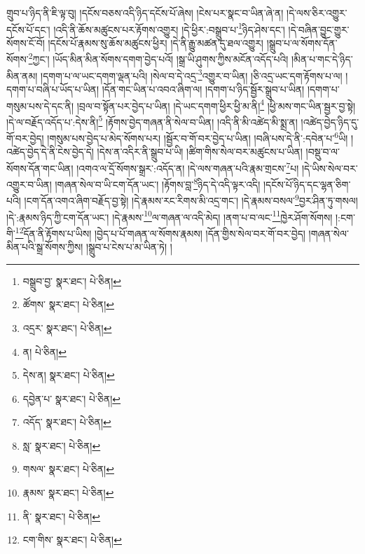 གྲུབ་པ་ཉིད་ནི་ཇི་ལྟ་བུ། །དངོས་བཅས་འདི་ཉིད་དངོས་པོ་ཞེས། །ངེས་པར་སྣང་བ་ཡིན་ཞེ་ན། །དེ་ལས་ཅིར་འགྱུར་དངོས་པོ་དང་། །འདི་ནི་ཆོས་མཚུངས་པར་རྟོགས་འགྱུར། །དེ་ཕྱིར་:བསྒྲུབ་པ་\footnote{བསྒྲུབ་བྱ་  སྣར་ཐང་།  པེ་ཅིན། }ཉིད་ཤེས་དང་། །དེ་བཞིན་བྱུང་གྱུར་སོགས་ངོ་བོ། །དངོས་པོ་རྣམས་སུ་ཆོས་མཚུངས་ཕྱིར། །དེ་ནི་རྒྱུ་མཚན་དུ་ཐལ་འགྱུར། །སྒྲུབ་པ་ལ་སོགས་དོན་སོགས་\footnote{ཚོགས་  སྣར་ཐང་།  པེ་ཅིན། }ཀྱང་། །ཡོད་མིན་མིན་སོགས་དགག་བྱེད་པའོ། །སྒྲ་ཡི་ཤུགས་ཀྱིས་མངོན་འདོད་པའི། །མིན་པ་གང་དེ་ཉིད་མིན་ནམ། །དགག་པ་ལ་ཡང་དགག་ལྡན་པའི། །སེལ་བ་དེ་འདྲ་\footnote{འདྲར་  སྣར་ཐང་།  པེ་ཅིན། }འགྱུར་བ་ཡིན། །ཅི་འདྲ་ཡང་དག་རྟོགས་པ་ལ། །དགག་པ་བཞི་པ་ཡོད་པ་ཡིན། །དོན་གང་ཡིན་པ་འབའ་ཞིག་ལ། །དགག་པ་ཉིད་སྦྱོར་སྒྲུབ་པ་ཡིན། །དགག་པ་གསུམ་པས་དེ་དང་ནི། །བྲལ་བ་སྟོན་པར་བྱེད་པ་ཡིན། །དེ་ཡང་དགག་ཕྱིར་ཕྱི་མ་ནི།\footnote{ན།  པེ་ཅིན། } །ཕྱི་མས་གང་ཡིན་སྦྱར་བྱ་སྟེ། །དེ་ལ་བརྗོད་འདོད་པ་:དེས་ནི།\footnote{དེས་ན།  སྣར་ཐང་།  པེ་ཅིན། } །རྟོགས་བྱེད་གཞན་ནི་སེལ་བ་ཡིན། །འདི་ནི་མི་འཚེད་མི་སྨྲ་ན། །འཚེད་བྱེད་ཉིད་དུ་གོ་བར་བྱེད། །གསུམ་པས་བྱེད་པ་མེད་སོགས་པར། །སྦྱོར་བ་གོ་བར་བྱེད་པ་ཡིན། །བཞི་པས་དེ་ནི་:དབེན་པ་\footnote{དབྱེན་པ་  སྣར་ཐང་།  པེ་ཅིན། }ཡི། །འཚེད་བྱེད་དེ་ནི་ངེས་བྱེད་དེ། །དེས་ན་འདིར་ནི་སྒྲུབ་པ་ཡི། །ཚིག་གིས་སེལ་བར་མཚུངས་པ་ཡིན། །བསྡུ་བ་ལ་སོགས་དོན་གང་ཡིན། །འགའ་ལ་དྲོ་སོགས་སྒྲར་:འདོད་ན། །དེ་ལས་གཞན་པའི་རྣམ་གྲངས་\footnote{འདོད་  སྣར་ཐང་།  པེ་ཅིན། }པ། །དེ་ཡིས་སེལ་བར་འགྱུར་བ་ཡིན། །གཞན་སེལ་བ་ཡི་ངག་དོན་ཡང་། །རྟོགས་བླ་\footnote{སླ་  སྣར་ཐང་།  པེ་ཅིན། }ཉིད་དེ་འདི་ལྟར་འདི། །དངོས་པོ་ཉིད་དང་ལྷན་ཅིག་པའི། །ངག་དོན་འགའ་ཞིག་བརྗོད་བྱ་སྟེ། །དེ་རྣམས་རང་རིགས་མི་འདྲ་གང་། །དེ་རྣམས་བསལ་\footnote{གསལ་  སྣར་ཐང་།  པེ་ཅིན། }བྱར་ཤིན་ཏུ་གསལ། །དེ་:རྣམས་ཉིད་ཀྱི་ངག་དོན་ཡང་། །དེ་རྣམས་\footnote{རྣམས་  སྣར་ཐང་།  པེ་ཅིན། }ལ་གཞན་ལ་འདི་མེད། །ནག་པ་བ་ལང་\footnote{ནི་  སྣར་ཐང་།  པེ་ཅིན། }ཁྱེར་ཤོག་སོགས། །:ངག་གི་\footnote{ངག་གིས་  སྣར་ཐང་།  པེ་ཅིན། }དོན་ནི་རྟོགས་པ་ཡིས། །བྱེད་པ་པོ་གཞན་ལ་སོགས་རྣམས། །དོན་གྱིས་སེལ་བར་གོ་བར་བྱེད། །གཞན་སེལ་མིན་པའི་སྒྲ་སོགས་ཀྱིས། །སྒྲུབ་པ་ངེས་པ་མ་ཡིན་ཏེ། །
